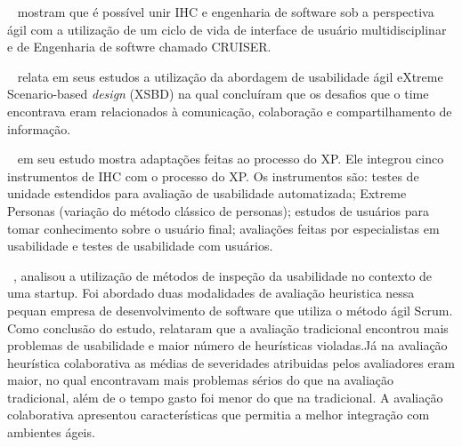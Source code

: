 ~ mostram que é possível unir IHC e engenharia de software sob a perspectiva ágil com a utilização de um ciclo de vida de interface de usuário multidisciplinar e de Engenharia de softwre chamado CRUISER.



~ relata em seus estudos a utilização da abordagem de usabilidade ágil eXtreme Scenario-based \emph{design} (XSBD) na qual concluíram que os desafios que o time encontrava eram relacionados à comunicação, colaboração e compartilhamento de informação.

~ em seu estudo mostra adaptações feitas ao processo do XP. Ele integrou cinco instrumentos de IHC com o processo do XP. Os instrumentos são: testes de unidade estendidos para avaliação de usabilidade automatizada; Extreme Personas (variação do método clássico de personas); estudos de usuários para tomar conhecimento sobre o usuário final; avaliações feitas por especialistas em usabilidade e testes de usabilidade com usuários.
 
~, analisou a utilização de métodos de inspeção da usabilidade no contexto de uma startup. Foi abordado duas modalidades de avaliação heuristica nessa pequan empresa de desenvolvimento de software que utiliza o método ágil Scrum. Como conclusão do estudo, relataram que a avaliação tradicional encontrou mais problemas de usabilidade e maior número de heurísticas violadas.Já na avaliação heurística colaborativa as médias de severidades atribuidas pelos avaliadores eram maior, no qual encontravam mais problemas sérios do que na avaliação tradicional, além de o tempo gasto foi menor do que na tradicional. A avaliação colaborativa apresentou características que permitia a melhor integração com ambientes ágeis.


